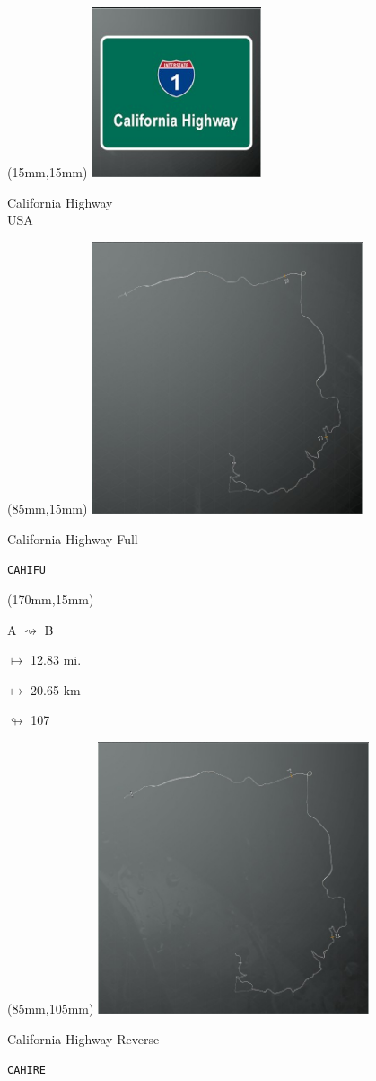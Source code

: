\begin{textblock*}{60mm}(15mm,15mm)%
\includegraphics[width=50mm]{LG/2015-05-20_00077.png}
\par California Highway\\ USA
\end{textblock*}
\begin{textblock*}{80mm}(85mm,15mm)%
\includegraphics[width=80mm]{TR/2015-05-20_00013.png}
\centerline{California Highway Full}
\par\hfill\tiny\tt CAHIFU\\
\end{textblock*}
\begin{textblock*}{30mm}(170mm,15mm)%
\par A $\rightsquigarrow$ B
\Large
\par$\mapsto$ 12.83 mi.
\par$\mapsto$ 20.65 km
\par$\looparrowright$ 107
\end{textblock*}
\begin{textblock*}{80mm}(85mm,105mm)%
\includegraphics[width=80mm]{TR/2015-05-20_00017.png}
\centerline{California Highway Reverse}
\par\hfill\tiny\tt CAHIRE\\
\end{textblock*}
